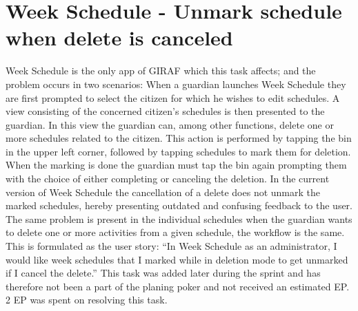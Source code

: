 \section{Week Schedule - Unmark schedule when delete is canceled}
Week Schedule is the only app of GIRAF which this task affects; and the problem occurs in two scenarios:
When a guardian launches Week Schedule they are first prompted to select the citizen for which he wishes to edit schedules.
A view consisting of the concerned citizen's schedules is then presented to the guardian.
In this view the guardian can, among other functions, delete one or more schedules related to the citizen.
This action is performed by tapping the bin in the upper left corner, followed by tapping schedules to mark them for deletion.
When the marking is done the guardian must tap the bin again prompting them with the choice of either completing or canceling the deletion.
In the current version of Week Schedule the cancellation of a delete does not unmark the marked schedules, hereby presenting outdated and confusing feedback to the user.
The same problem is present in the individual schedules when the guardian wants to delete one or more activities from a given schedule, the workflow is the same.
This is formulated as the user story: ``In Week Schedule as an administrator, I would like week schedules that I marked while in deletion mode to get unmarked if I cancel the delete.''
This task was added later during the sprint and has therefore not been a part of the planing poker and not received an estimated EP.
2 EP was spent on resolving this task. 


